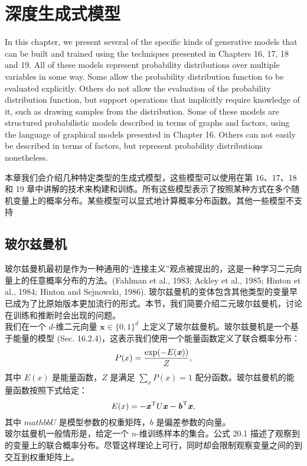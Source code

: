 \chapter{深度生成式模型}
\label{ch:generative_models}

In this chapter, we present several of the specific kinds of generative models that can be built and trained using the techniques presented in Chapters 16, 17, 18 and 19. All of these models represent probability distributions over multiple variables in some way. Some allow the probability distribution function to be evaluated explicitly. Others do not allow the evaluation of the probability distribution function, but support operations that implicitly require knowledge of it, such as drawing samples from the distribution. Some of these models are structured probabilistic models described in terms of graphs and factors, using the language of graphical models presented in Chapter 16. Others can not easily be described in terms of factors, but represent probability distributions nonetheless.

本章我们会介绍几种特定类型的生成式模型，这些模型可以使用在第 16、17、18 和 19 章中讲解的技术来构建和训练。所有这些模型表示了按照某种方式在多个随机变量上的概率分布。某些模型可以显式地计算概率分布函数。其他一些模型不支持


\section{玻尔兹曼机}
玻尔兹曼机最初是作为一种通用的“连接主义”观点被提出的，这是一种学习二元向量上的任意概率分布的方法。(Fahlman et al., 1983; Ackley et al., 1985; Hinton et al., 1984; Hinton and Sejnowski, 1986). 玻尔兹曼机的变体包含其他类型的变量早已成为了比原始版本更加流行的形式。本节，我们简要介绍二元玻尔兹曼机，讨论在训练和推断时会出现的问题。\\

我们在一个 $d$-维二元向量 $\mathbf{x} \in \{0,1\}^d$ 上定义了玻尔兹曼机。玻尔兹曼机是一个基于能量的模型 (Sec. 16.2.4)，这表示我们使用一个能量函数定义了联合概率分布：
$$P(x) = \frac{\exp(-E( \textbf{\emph{x}}))}{Z},$$
其中 $E(x)$ 是能量函数，$Z$ 是满足 $\sum_x P(x) = 1$ 配分函数。玻尔兹曼机的能量函数按照下式给定：
$$E(x) = - \textbf{\emph{x}}^\mathrm{ T } U  \textbf{\emph{x}}  -  \textbf{\emph{b}}^\mathrm{ T }  \textbf{\emph{x}},$$
其中 $mathbb{U}$ 是模型参数的权重矩阵，$b$ 是偏差参数的向量。\\
玻尔兹曼机一般情形是，给定一个 $n$-维训练样本的集合。公式 20.1 描述了观察到的变量上的联合概率分布。尽管这样理论上可行，同时却会限制观察变量之间的到交互到权重矩阵上。

























